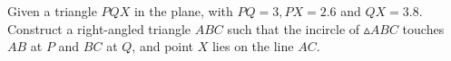 Given a triangle $PQX$ in the plane, with $PQ = 3, PX = 2.6$ and $QX = 3.8$. Construct a right-angled triangle $ABC$ such that the incircle of $\vartriangle ABC$ touches $AB$ at $P$ and $BC$ at $Q$, and point $X$ lies on the line $AC$.